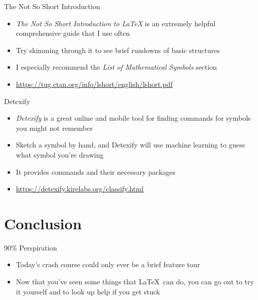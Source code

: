 \documentclass{beamer} %
\begin{document}
\begin{frame}{The Not So Short Introduction}

\begin{itemize}
	\item \textit{The Not So Short Introduction to \LaTeX} is an extremely helpful comprehensive guide that I use often
	\item Try skimming through it to see brief rundowns of basic structures
	\item I especially recommend the \textit{List of Mathematical Symbols} section
	\item \url{https://tug.ctan.org/info/lshort/english/lshort.pdf}
\end{itemize}

\end{frame}

\begin{frame}{Detexify}

\begin{itemize}
	\item \textit{Detexify} is a great online and mobile tool for finding commands for symbols you might not remember
	\item Sketch a symbol by hand, and Detexify will use machine learning to guess what symbol you're drawing
	\item It provides commands and their necessary packages
	\item \url{https://detexify.kirelabs.org/classify.html}
\end{itemize}

\end{frame}

\section{Conclusion}

\begin{frame}{90\% Perspiration}

\begin{itemize}
	\item Today's crash course could only ever be a brief feature tour
	\item Now that you've seen some things that \LaTeX\ can do, you can go out to try it yourself and to look up help if you get stuck
\end{itemize}

\end{frame}
\end{document}
